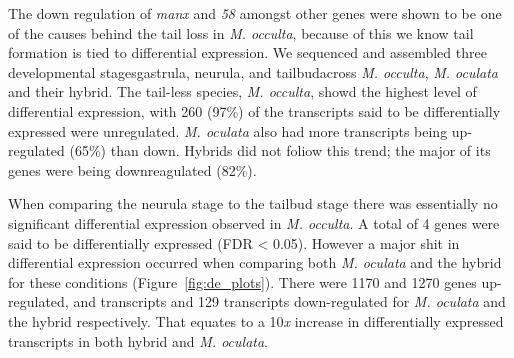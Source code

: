 \begin{table}[b]
\caption{Differential expression: Species \textit{vs} time}
\end{table}

The down regulation of \textit{manx} and \textit{58} amongst other genes were shown to be one of the causes behind the tail loss in \textit{M. occulta}, because of this we know tail formation is tied to differential expression. We sequenced and assembled three developmental stages\textemdash gastrula, neurula, and tailbud\textemdash across \textit{M. occulta}, \textit{M. oculata} and their hybrid. The tail-less species, \textit{M. occulta}, showd the highest level of differential expression, with 260 (97\%) of the transcripts said to be differentially expressed were unregulated. \textit{M. oculata} also had more transcripts being up-regulated (65\%) than down. Hybrids did not foliow this trend; the major of its genes were being downreagulated (82\%).  

When comparing the neurula stage to the tailbud stage there was essentially no significant differential expression observed in \textit{M. occulta}. A total of 4 genes were said to be differentially expressed (FDR < 0.05). However a major shit in differential expression occurred when comparing both \textit{M. oculata} and the hybrid for these conditions (Figure~\ref{fig:de_plots}). There were 1170 and 1270 genes up-regulated, and transcripts and 129 transcripts down-regulated for \textit{M. oculata} and the hybrid respectively. That equates to a 10\textit{x} increase in differentially expressed transcripts in both hybrid and \textit{M. oculata}.


